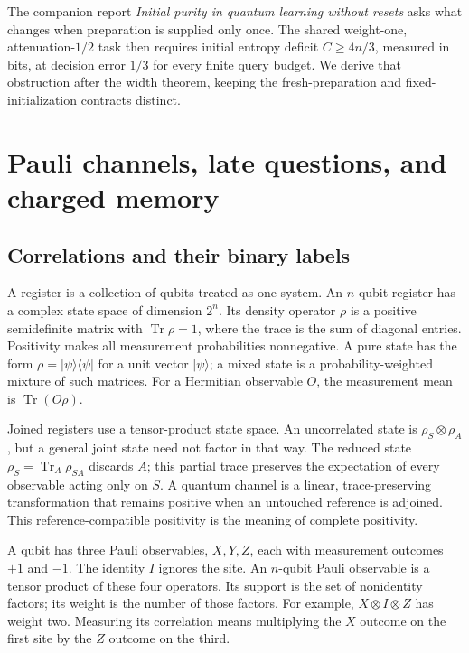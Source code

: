 \documentclass[11pt,a4paper]{article}
\numberwithin{equation}{section}
\theoremstyle{definition}
\theoremstyle{remark}
\begin{document}
The companion report \emph{Initial purity in quantum learning without resets} asks what changes when preparation is supplied only once. The shared weight-one, attenuation-\(1/2\) task then requires initial entropy deficit \(C\geq4n/3\), measured in bits, at decision error \(1/3\) for every finite query budget. We derive that obstruction after the width theorem, keeping the fresh-preparation and fixed-initialization contracts distinct.

\section{Pauli channels, late questions, and charged memory}
\subsection{Correlations and their binary labels}
A register is a collection of qubits treated as one system. An \(n\)-qubit register has a complex state space of dimension \(2^n\). Its density operator \(\rho\) is a positive semidefinite matrix with \(\operatorname{Tr}\rho=1\), where the trace is the sum of diagonal entries. Positivity makes all measurement probabilities nonnegative. A pure state has the form \(\rho=|\psi\rangle\langle\psi|\) for a unit vector \(|\psi\rangle\); a mixed state is a probability-weighted mixture of such matrices. For a Hermitian observable \(O\), the measurement mean is \(\operatorname{Tr}(O\rho)\).

Joined registers use a tensor-product state space. An uncorrelated state is \(\rho_S\otimes\rho_A\), but a general joint state need not factor in that way. The reduced state \(\rho_S=\operatorname{Tr}_A\rho_{SA}\) discards \(A\); this partial trace preserves the expectation of every observable acting only on \(S\). A quantum channel is a linear, trace-preserving transformation that remains positive when an untouched reference is adjoined. This reference-compatible positivity is the meaning of complete positivity.

A qubit has three Pauli observables, \(X,Y,Z\), each with measurement outcomes \(+1\) and \(-1\). The identity \(I\) ignores the site. An \(n\)-qubit Pauli observable is a tensor product of these four operators. Its support is the set of nonidentity factors; its weight is the number of those factors. For example, \(X\otimes I\otimes Z\) has weight two. Measuring its correlation means multiplying the \(X\) outcome on the first site by the \(Z\) outcome on the third.
\end{document}
